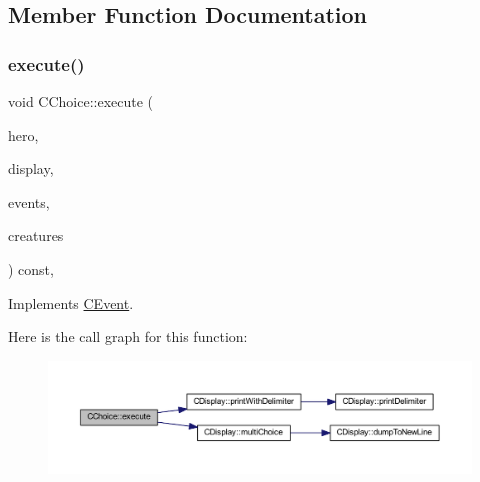 \subsection{Member Function Documentation}
\mbox{\label{class_c_choice_aeccaa71a8fcd358215fe0ddbc37ab143}} 
\subsubsection{\texorpdfstring{execute()}{execute()}}
{\footnotesize\ttfamily void C\+Choice\+::execute (\begin{DoxyParamCaption}\item[{\mbox{\hyperlink{class_c_hero}{C\+Hero}} \&}]{hero,  }\item[{const \mbox{\hyperlink{class_c_display}{C\+Display}} \&}]{display,  }\item[{const std\+::map$<$ int, const \mbox{\hyperlink{class_c_event}{C\+Event}} $\ast$$>$ \&}]{events,  }\item[{const std\+::map$<$ int, const \mbox{\hyperlink{class_c_creature}{C\+Creature}} $\ast$$>$ \&}]{creatures }\end{DoxyParamCaption}) const\hspace{0.3cm}{\ttfamily [override]}, {\ttfamily [virtual]}}



Implements \mbox{\hyperlink{class_c_event_a46bd2925f7f19c5c0d6adf2b1e6e3f70}{C\+Event}}.

Here is the call graph for this function\+:\nopagebreak
\begin{figure}[H]
\begin{center}
\leavevmode
\includegraphics[width=350pt]{class_c_choice_aeccaa71a8fcd358215fe0ddbc37ab143_cgraph}
\end{center}
\end{figure}
\mbox{\label{class_c_choice_a5280ff7c539ed8c8a4007ac38822d9b9}} 
